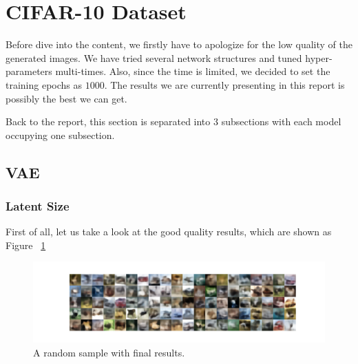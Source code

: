 \documentclass[12pt,letterpaper]{article}
\begin{document}
\section{CIFAR-10 Dataset}

Before dive into the content, we firstly have to apologize for the low quality of the generated images. We have tried several network structures and tuned hyper-parameters multi-times. Also, since the time is limited, we decided to set the training epochs as $1000$. The results we are currently presenting in this report is possibly the best we can get.

Back to the report, this section is separated into $3$ subsections with each model occupying one subsection.

\subsection{VAE}

\subsubsection{Latent Size}

First of all, let us take a look at the good quality results, which are shown as Figure ~\ref{fig:CIFAR_VAE_latent_results} 

\begin{figure}[h]
    \centering
    \includegraphics[width=.8\linewidth]{VAE_CIFAR_0_100_256.png}
    \caption{\small A random sample with final results.}
    \label{fig:CIFAR_VAE_latent_results}
\end{figure}
\end{document}
